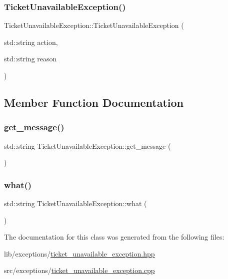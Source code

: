 \subsubsection{\texorpdfstring{Ticket\+Unavailable\+Exception()}{TicketUnavailableException()}}
{\footnotesize\ttfamily Ticket\+Unavailable\+Exception\+::\+Ticket\+Unavailable\+Exception (\begin{DoxyParamCaption}\item[{std\+::string}]{action,  }\item[{std\+::string}]{reason }\end{DoxyParamCaption})}



\subsection{Member Function Documentation}
\mbox{\label{class_ticket_unavailable_exception_a4aadce4bf1d2958e91576d4d4cad1102}} 
\subsubsection{\texorpdfstring{get\+\_\+message()}{get\_message()}}
{\footnotesize\ttfamily std\+::string Ticket\+Unavailable\+Exception\+::get\+\_\+message (\begin{DoxyParamCaption}{ }\end{DoxyParamCaption})}

\mbox{\label{class_ticket_unavailable_exception_a6b364ac50564675499a5f24f8d97faed}} 
\subsubsection{\texorpdfstring{what()}{what()}}
{\footnotesize\ttfamily std\+::string Ticket\+Unavailable\+Exception\+::what (\begin{DoxyParamCaption}{ }\end{DoxyParamCaption})}



The documentation for this class was generated from the following files\+:\begin{DoxyCompactItemize}
\item 
lib/exceptions/\hyperlink{ticket__unavailable__exception_8hpp}{ticket\+\_\+unavailable\+\_\+exception.\+hpp}\item 
src/exceptions/\hyperlink{ticket__unavailable__exception_8cpp}{ticket\+\_\+unavailable\+\_\+exception.\+cpp}\end{DoxyCompactItemize}
